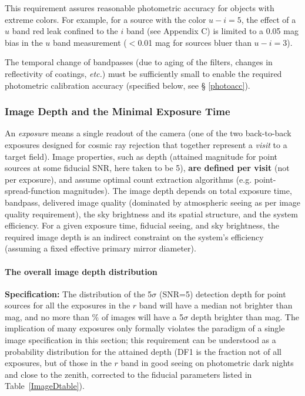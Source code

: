 This requirement assures reasonable photometric accuracy for objects with
extreme colors. For example, for a source with the color $u-i=5$, the
effect of a $u$ band red leak confined to the $i$ band (\eg see Appendix
C) is limited to a 0.05 mag bias in the $u$ band measurement ($<$0.01 mag
for sources bluer than $u-i=3$).

The temporal change of bandpasses (due to aging of the filters, changes in
reflectivity of coatings, \textit{etc.}) must be sufficiently small to enable
the required photometric calibration accuracy (specified below, see \S
\ref{photoacc}).



\subsubsection{Image Depth and the Minimal Exposure Time}

An \textit{exposure} means a single readout of the camera (one of the two
back-to-back exposures designed for cosmic ray rejection that together
represent a \textit{visit} to a target field).  Image properties, such as
depth (attained magnitude for point sources at some fiducial SNR, here
taken to be 5), \textbf{are defined per visit} (not per exposure), and assume optimal
count extraction algorithms (e.g. point-spread-function magnitudes). The image
depth depends on total exposure time, bandpass, delivered image quality
(dominated by atmospheric seeing as per image quality requirement), the sky
brightness and its spatial structure, and the system efficiency. For a
given exposure time, fiducial seeing, and sky brightness, the required
image depth is an indirect constraint on the system's efficiency (assuming
a fixed effective primary mirror diameter).


\paragraph{The overall image depth distribution\\}
\label{singleimagedepth}


\textbf{Specification:} The distribution of the 5$\sigma$ (SNR=5) detection
depth for point sources for all the exposures in the $r$ band will have a
median not brighter than
mag, and no more than
\% of
images will have a 5$\sigma$ depth brighter than
mag. The implication
of many exposures only formally violates the paradigm of a single image
specification in this section; this requirement can be understood as a
probability distribution for the attained depth (DF1 is the fraction
not of all exposures, but of those in the $r$ band in good seeing on photometric
dark nights and close to the zenith, corrected to the fiducial parameters
listed in Table~\ref{ImageDtable}).

